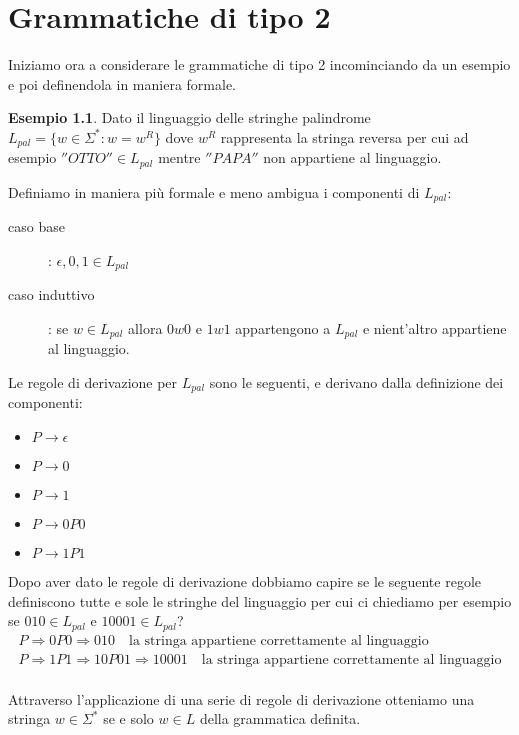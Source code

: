 \documentclass[a4paper]{report}
\theoremstyle{definition}%
\newtheorem*{esempio}{Esempio}
\begin{document}
\chapter{Grammatiche di tipo 2}
Iniziamo ora a considerare le grammatiche di tipo 2 incominciando da un esempio e poi definendola in maniera formale.
\begin{esempio}
  Dato il linguaggio delle stringhe palindrome $L _{pal} = \{w \in \Sigma ^ * : w = w ^ R\}$ dove $w^R$ rappresenta la stringa
  reversa per cui ad esempio $''OTTO'' \in L _ {pal}$ mentre $''PAPA''$ non appartiene al linguaggio.
 
  Definiamo in maniera più formale e meno ambigua i componenti di $L_{pal}$:
  \begin{description}
  \item [caso base]: $\epsilon, 0, 1 \in L_{pal}$
  \item [caso induttivo]: se $w \in L_{pal}$ allora $0w0$ e $1w1$ appartengono a $L_{pal}$ e nient'altro appartiene al linguaggio.
  \end{description}
  Le regole di derivazione per $L_{pal}$ sono le seguenti, e derivano dalla definizione dei componenti:
  \begin{itemize}
  \item $P \to \epsilon$
  \item $P \to 0$
  \item $P \to 1$
  \item $P \to 0P0$
  \item $P \to 1P1$
  \end{itemize}
  Dopo aver dato le regole di derivazione dobbiamo capire se le seguente regole definiscono tutte e sole le stringhe del linguaggio per
  cui ci chiediamo per esempio se $010 \in L_{pal}$ e $10001 \in L_{pal}$?
  \begin{align}
    P \Rightarrow 0P0 \Rightarrow 010  \quad \text{la stringa appartiene correttamente al linguaggio}\\
    P \Rightarrow 1P1 \Rightarrow 10P01 \Rightarrow 10001 \quad \text{la stringa appartiene correttamente al linguaggio}\\
  \end{align}
  
  Attraverso l'applicazione di una serie di regole di derivazione otteniamo una stringa $w \in \Sigma ^*$ se e solo $w \in L$
  della grammatica definita.
\end{esempio}
\end{document}
